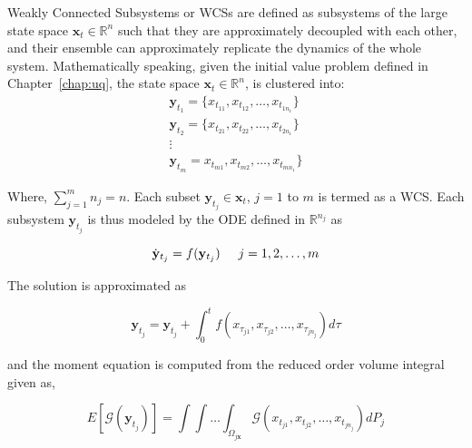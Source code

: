 Weakly Connected Subsystems or WCSs are defined as subsystems of the large state space $\mathbf{x}_t \in \mathbb{R}^n$ such that they are approximately decoupled with each other, and their ensemble can approximately replicate the dynamics of the whole system. Mathematically speaking, given the initial value problem defined in Chapter~\ref{chap:uq}, the state space $ \textbf{x}_t \in \mathbb{R}^n$, is clustered into:
\begin{equation}
\label{clustmodel}
\begin{array}{l}
\mathbf{y}_{t_1} = \lbrace x_{t_{11}},x_{t_{12}},\ldots,x_{t_{1n_1}} \rbrace  \\
\mathbf{y}_{t_2} = \lbrace x_{t_{21}},x_{t_{22}},\ldots,x_{t_{2n_1}} \rbrace  \\
\vdots  \\
\mathbf{y}_{t_m} = x_{t_{m1}},x_{t_{m2}},\ldots,x_{t_{mn_1}} \rbrace 
\end{array}
\end{equation}

Where, $\sum_{j=1}^m n_j = n$. Each subset $\mathbf{y}_{t_j} \in \textbf{x}_t$, $j = 1$ to $m$ is termed as a WCS. Each subsystem $\mathbf{y}_{t_j}$ is thus modeled by the ODE defined in $\mathbb{R}^{n_j}$ as 

\begin{equation}
\label{substochdyn}
\dot{\mathbf{y}}_{t_j} = f(\mathbf{y}_{t_j}) \hspace{5 mm} j = 1,2,\ldots,m
\end{equation} 

\noindent The solution is approximated as

\begin{equation}
\label{integral_wcs}
\mathbf{y}_{t_j} =   \mathbf{y}_{t_j} + \int_0^t f(x_{\tau_{j1}},x_{\tau_{j2}},\ldots,x_{\tau_{jn_j}}) d \tau
\end{equation}

\noindent and the moment equation is computed from the reduced order volume integral given as,

\begin{equation}
\label{moment_wcs}
E[\mathcal{G}(\mathbf{y}_{t_j})] = \int  \int \ldots \int_{\Omega_{j \textbf{x}}} \mathcal{G}(x_{t_{j1}},x_{t_{j2}},\ldots,x_{t_{jn_j}}) dP_j
\end{equation}

